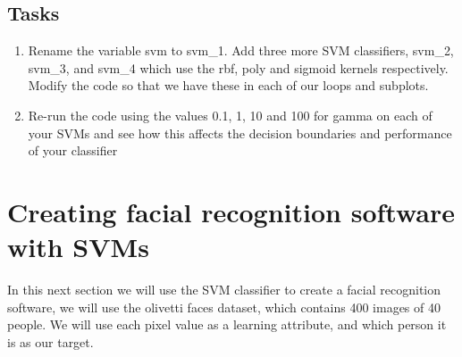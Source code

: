 \documentclass[12pt]{article}
\begin{document}
\subsection{Tasks}
\begin{enumerate}
\item Rename the variable svm to svm\_1. Add three more SVM classifiers, svm\_2, svm\_3, and svm\_4 which use the rbf, poly and sigmoid kernels respectively. Modify the code so that we have these in each of our loops and subplots.



\item Re-run the code using the values 0.1, 1, 10 and 100 for gamma on each of your SVMs and see how this affects the decision boundaries and performance of your classifier
\end{enumerate}

\section{Creating facial recognition software with SVMs}
In this next section we will use the SVM classifier to create a facial recognition software, we will use the olivetti faces dataset, which contains 400 images of 40 people. We will use each pixel value as a learning attribute, and which person it is as our target.
\end{document}
